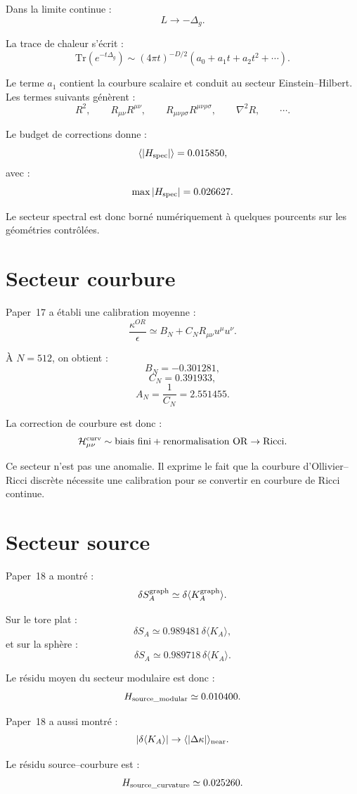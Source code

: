 \documentclass[11pt,a4paper]{article}
\begin{document}
Dans la limite continue :
\[
L\to-\Delta_g.
\]

La trace de chaleur s'écrit :
\[
\mathrm{Tr}(e^{-t\Delta_g})
\sim
(4\pi t)^{-D/2}
\left(
a_0+a_1t+a_2t^2+\cdots
\right).
\]

Le terme \(a_1\) contient la courbure scalaire et conduit au secteur
Einstein--Hilbert. Les termes suivants génèrent :
\[
R^2,
\qquad
R_{\mu\nu}R^{\mu\nu},
\qquad
R_{\mu\nu\rho\sigma}R^{\mu\nu\rho\sigma},
\qquad
\nabla^2R,
\qquad
\cdots.
\]

Le budget de corrections donne :
\[
\langle |H_{\rm spec}|\rangle=0.015850,
\]
avec :
\[
\max |H_{\rm spec}|=0.026627.
\]

Le secteur spectral est donc borné numériquement à quelques pourcents sur les
géométries contrôlées.

\section{Secteur courbure}

Paper~17 a établi une calibration moyenne :
\[
\frac{\kappa^{OR}}{\epsilon}
\simeq
B_N+C_N R_{\mu\nu}u^\mu u^\nu.
\]

À \(N=512\), on obtient :
\[
B_N=-0.301281,
\]
\[
C_N=0.391933,
\]
\[
A_N=\frac{1}{C_N}=2.551455.
\]

La correction de courbure est donc :
\[
\mathcal{H}_{\mu\nu}^{\rm curv}
\sim
{\rm biais\ fini}
+
{\rm renormalisation\ OR\to Ricci}.
\]

Ce secteur n'est pas une anomalie. Il exprime le fait que la courbure
d'Ollivier--Ricci discrète nécessite une calibration pour se convertir en
courbure de Ricci continue.

\section{Secteur source}

Paper~18 a montré :
\[
\delta S_A^{\rm graph}
\simeq
\delta\langle K_A^{\rm graph}\rangle.
\]

Sur le tore plat :
\[
\delta S_A\simeq0.989481\,\delta\langle K_A\rangle,
\]
et sur la sphère :
\[
\delta S_A\simeq0.989718\,\delta\langle K_A\rangle.
\]

Le résidu moyen du secteur modulaire est donc :
\[
H_{\rm source\_modular}\simeq0.010400.
\]

Paper~18 a aussi montré :
\[
|\delta\langle K_A\rangle|
\to
\langle|\Delta\kappa|\rangle_{\rm near}.
\]

Le résidu source--courbure est :
\[
H_{\rm source\_curvature}\simeq0.025260.
\]
\end{document}
